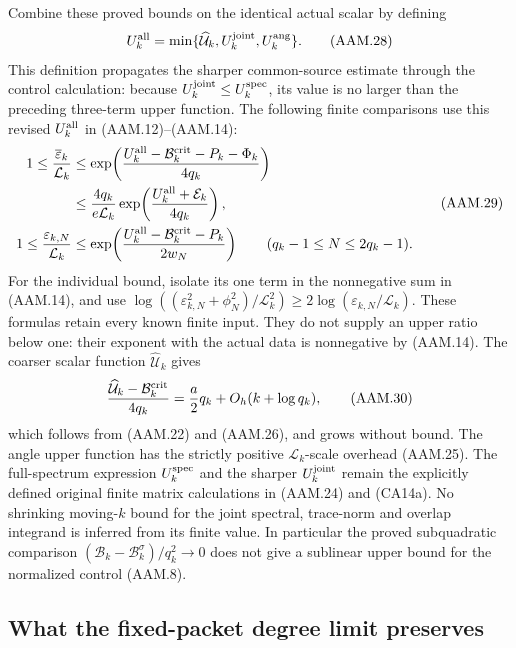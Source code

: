 Combine these proved bounds on the identical actual scalar by defining
\[
 U_k^{\rm all}=\min\{\widehat{\mathcal U}_k,
                                  U_k^{\rm joint},U_k^{\rm ang}\}.
 \tag{AAM.28}
\]
This definition propagates the sharper common-source estimate
through the control calculation: because $U_k^{\rm joint}\le
U_k^{\rm spec}$, its value is no larger than the preceding
three-term upper function. The following finite comparisons use
this revised $U_k^{\rm all}$ in (AAM.12)--(AAM.14):
\[
 \begin{aligned}
 1\leq\frac{\overline\varepsilon_k}{\mathcal L_k}
 &\leq\exp\!\left(
 \frac{U_k^{\rm all}-\mathcal B_k^{\rm crit}-P_k-\Phi_k}{4q_k}
                    \right)\\
 &\leq\frac{4q_k}{e\mathcal L_k}
       \exp\!\left(\frac{U_k^{\rm all}+\mathcal E_k}{4q_k}\right),\\
 1\leq\frac{\varepsilon_{k,N}}{\mathcal L_k}
 &\leq\exp\!\left(
 \frac{U_k^{\rm all}-\mathcal B_k^{\rm crit}-P_k}{2w_N}
                    \right)
       \qquad(q_k-1\leq N\leq2q_k-1).
 \end{aligned}
 \tag{AAM.29}
\]
For the individual bound, isolate its one term in the nonnegative sum
in (AAM.14), and use
$\log((\varepsilon_{k,N}^2+\phi_N^2)/\mathcal L_k^2)
\geq2\log(\varepsilon_{k,N}/\mathcal L_k)$.
These formulas retain every known finite input. They do not supply
an upper ratio below one: their exponent with the actual data is
nonnegative by (AAM.14). The coarser scalar function
$\widehat{\mathcal U}_k$ gives
\[
 \frac{\widehat{\mathcal U}_k-\mathcal B_k^{\rm crit}}{4q_k}
          =\frac a2q_k+O_h(k+\log q_k),
 \tag{AAM.30}
\]
which follows from (AAM.22) and (AAM.26), and grows without bound.
The angle upper function has the strictly positive
$\mathcal L_k$-scale overhead (AAM.25). The full-spectrum expression
$U_k^{\rm spec}$ and the sharper $U_k^{\rm joint}$ remain the
explicitly defined original finite matrix calculations in (AAM.24)
and (CA14a). No shrinking moving-$k$ bound for the joint spectral,
trace-norm and overlap integrand is inferred from its finite value. In particular the
proved subquadratic comparison
$(\mathcal B_k-\mathcal B_k^\sigma)/q_k^2\to0$ does not give a
sublinear upper bound for the normalized control (AAM.8).

\subsection{What the fixed-packet degree limit preserves}

